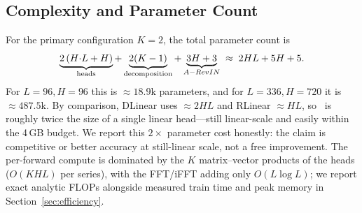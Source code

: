 \subsection{Complexity and Parameter Count}
\label{sec:method:complexity}

For the primary configuration $K{=}2$, the total parameter count is
\begin{equation}
\underbrace{2\,(H{\cdot}L + H)}_{\text{heads}}
+ \underbrace{2(K-1)}_{\text{decomposition}}
+ \underbrace{3H + 3}_{A-RevIN}
\;\approx\; 2HL + 5H + 5.
\label{eq:params}
\end{equation}
For $L{=}96, H{=}96$ this is $\approx 18.9$k parameters, and for
$L{=}336, H{=}720$ it is $\approx 487.5$k. By comparison, DLinear uses
$\approx 2HL$ and RLinear $\approx HL$, so \method\ is roughly twice the size of
a single linear head---still linear-scale and easily within the 4\,GB budget. We
report this $2\times$ parameter cost honestly: the claim is competitive or better
accuracy at still-linear scale, not a free improvement. The per-forward compute
is dominated by the $K$ matrix--vector products of the heads ($O(KHL)$ per
series), with the FFT/iFFT adding only $O(L\log L)$; we report exact analytic
FLOPs alongside measured train time and peak memory in
Section~\ref{sec:efficiency}.
